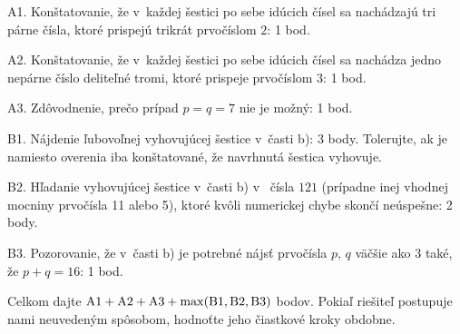 {\smallskip
\item{A1.} Konštatovanie, že v~každej šestici po sebe idúcich čísel sa nachádzajú tri párne čísla, ktoré prispejú trikrát prvočíslom $2$: 1 bod.
\item{A2.} Konštatovanie, že v~každej šestici po sebe idúcich čísel sa nachádza jedno nepárne číslo deliteľné tromi, ktoré prispeje prvočíslom $3$: 1 bod.
\item{A3.} Zdôvodnenie, prečo prípad $p=q=7$ nie je možný: 1 bod.
\item{B1.} Nájdenie ľubovoľnej vyhovujúcej šestice v~časti b): 3 body.\hfil\break
Tolerujte, ak je namiesto overenia iba konštatované, že navrhnutá šestica  vyhovuje.
\item{B2.} Hľadanie vyhovujúcej šestice v~časti b) v~ čísla $121$ (prípadne inej vhodnej mocniny prvočísla 11 alebo 5), ktoré kvôli numerickej chybe skončí neúspešne: 2 body.
\item{B3.} Pozorovanie, že v~časti b) je potrebné nájsť prvočísla $p$, $q$ väčšie ako 3 také, že $p+q=16$: 1 bod.

\smallskip\noindent
Celkom dajte $\rm A1 + A2 +A3 +\max(B1,B2,B3)$ bodov.
Pokiaľ riešiteľ postupuje nami neuvedeným spôsobom, hodnoťte jeho
čiastkové kroky obdobne.
\endschema
}

